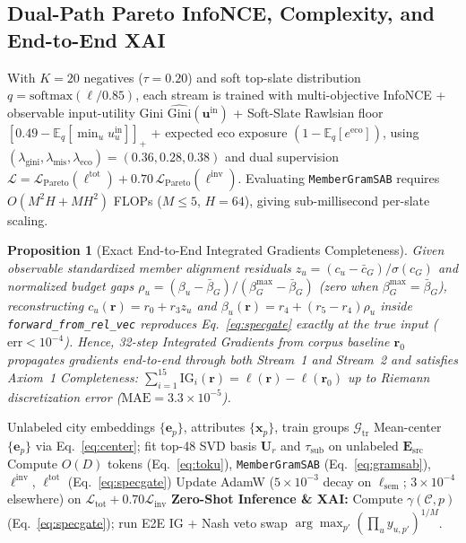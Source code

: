 \documentclass[final,5p,twocolumn]{elsarticle}
\newtheorem{proposition}{Proposition}
\begin{document}
\subsection{Dual-Path Pareto InfoNCE, Complexity, and End-to-End XAI}
With $K{=}20$ negatives ($\tau{=}0.20$) and soft top-slate distribution $q = \text{softmax}(\boldsymbol{\ell}/0.85)$, each stream is trained with multi-objective InfoNCE + observable input-utility Gini $\widehat{\text{Gini}}(\mathbf{u}^{\text{in}})$ + Soft-Slate Rawlsian floor $[0.49 - \mathbb{E}_q[\min_u u^{\text{in}}_u]]_+$ + expected eco exposure $(1 - \mathbb{E}_q[e^{\text{eco}}])$, using $(\lambda_{\text{gini}}, \lambda_{\text{mis}}, \lambda_{\text{eco}}) = (0.36, 0.28, 0.38)$ and dual supervision $\mathcal{L} = \mathcal{L}_{\text{Pareto}}(\ell^{\text{tot}}) + 0.70\,\mathcal{L}_{\text{Pareto}}(\ell^{\text{inv}})$. Evaluating \texttt{MemberGramSAB} requires $O(M^2 H + M H^2)$ FLOPs ($M{\le}5$, $H{=}64$), giving sub-millisecond per-slate scaling.

\begin{proposition}[Exact End-to-End Integrated Gradients Completeness]
Given observable standardized member alignment residuals $z_u = (c_u - \bar{c}_G)/\sigma(c_G)$ and normalized budget gaps $\rho_u = (\beta_u - \bar{\beta}_G)/(\beta^{\max}_G - \bar{\beta}_G)$ (zero when $\beta^{\max}_G{=}\bar{\beta}_G$), reconstructing $c_u(\mathbf{r}) = r_0 + r_3 z_u$ and $\beta_u(\mathbf{r}) = r_4 + (r_5 - r_4)\rho_u$ inside \texttt{forward\_from\_rel\_vec} reproduces Eq.~\eqref{eq:specgate} exactly at the true input ($\text{err} < 10^{-4}$). Hence, 32-step Integrated Gradients from corpus baseline $\mathbf{r}_0$ propagates gradients end-to-end through both Stream~1 and Stream~2 and satisfies Axiom~1 Completeness: $\sum_{i=1}^{15}\text{IG}_i(\mathbf{r}) = \ell(\mathbf{r}) - \ell(\mathbf{r}_0)$ up to Riemann discretization error ($\text{MAE} = 3.3{\times}10^{-5}$).
\end{proposition}

\begin{algorithm}[t]
\caption{TripSense-FairNet v3 Dual-Path Training \& End-to-End Recourse}
\label{alg:fairnet}
\begin{algorithmic}[1]
\REQUIRE Unlabeled city embeddings $\{\mathbf{e}_p\}$, attributes $\{\mathbf{x}_p\}$, train groups $\mathcal{G}_{\text{tr}}$
\STATE Mean-center $\{\mathbf{e}_p\}$ via Eq.~\eqref{eq:center}; fit top-48 SVD basis $\mathbf{U}_r$ and $\tau_{\text{sub}}$ on unlabeled $\mathbf{E}_{\text{src}}$
        \STATE Compute $O(D)$ tokens (Eq.~\eqref{eq:toku}), \texttt{MemberGramSAB} (Eq.~\eqref{eq:gramsab}), $\ell^{\text{inv}}$, $\ell^{\text{tot}}$ (Eq.~\eqref{eq:specgate})
        \STATE Update AdamW ($5{\times}10^{-3}$ decay on $\ell_{\text{sem}}$; $3{\times}10^{-4}$ elsewhere) on $\mathcal{L}_{\text{tot}} + 0.70\mathcal{L}_{\text{inv}}$
    \ENDFOR
\ENDFOR
\STATE \textbf{Zero-Shot Inference \& XAI:} Compute $\gamma(\mathcal{C}, p)$ (Eq.~\eqref{eq:specgate}); run E2E IG + Nash veto swap $\arg\max_{p'}(\prod_u y_{u,p'})^{1/M}$.
\end{algorithmic}
\end{algorithm}
\end{document}
